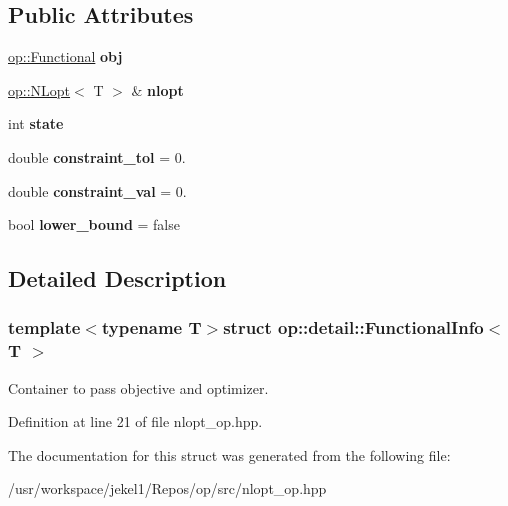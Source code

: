 \subsection*{Public Attributes}
\begin{DoxyCompactItemize}
\item 
\hypertarget{structop_1_1detail_1_1FunctionalInfo_a75b307e114fc03c879bb8fcfeeae83ad}{\hyperlink{classop_1_1Functional}{op\-::\-Functional} {\bfseries obj}}\label{structop_1_1detail_1_1FunctionalInfo_a75b307e114fc03c879bb8fcfeeae83ad}

\item 
\hypertarget{structop_1_1detail_1_1FunctionalInfo_a1cd58caba8132316014eb2367a11558d}{\hyperlink{classop_1_1NLopt}{op\-::\-N\-Lopt}$<$ T $>$ \& {\bfseries nlopt}}\label{structop_1_1detail_1_1FunctionalInfo_a1cd58caba8132316014eb2367a11558d}

\item 
\hypertarget{structop_1_1detail_1_1FunctionalInfo_a3af81392fd0b276d83f15fba073782bb}{int {\bfseries state}}\label{structop_1_1detail_1_1FunctionalInfo_a3af81392fd0b276d83f15fba073782bb}

\item 
\hypertarget{structop_1_1detail_1_1FunctionalInfo_a89df6f56725ac204f52f90ee260b36f6}{double {\bfseries constraint\-\_\-tol} = 0.}\label{structop_1_1detail_1_1FunctionalInfo_a89df6f56725ac204f52f90ee260b36f6}

\item 
\hypertarget{structop_1_1detail_1_1FunctionalInfo_a15287b9b16bd051c2cc6a4bc9fda8bf0}{double {\bfseries constraint\-\_\-val} = 0.}\label{structop_1_1detail_1_1FunctionalInfo_a15287b9b16bd051c2cc6a4bc9fda8bf0}

\item 
\hypertarget{structop_1_1detail_1_1FunctionalInfo_a8cdacd64fc88a319d3927008d523cd74}{bool {\bfseries lower\-\_\-bound} = false}\label{structop_1_1detail_1_1FunctionalInfo_a8cdacd64fc88a319d3927008d523cd74}

\end{DoxyCompactItemize}


\subsection{Detailed Description}
\subsubsection*{template$<$typename T$>$struct op\-::detail\-::\-Functional\-Info$<$ T $>$}

Container to pass objective and optimizer. 

Definition at line 21 of file nlopt\-\_\-op.\-hpp.



The documentation for this struct was generated from the following file\-:\begin{DoxyCompactItemize}
\item 
/usr/workspace/jekel1/\-Repos/op/src/nlopt\-\_\-op.\-hpp\end{DoxyCompactItemize}
